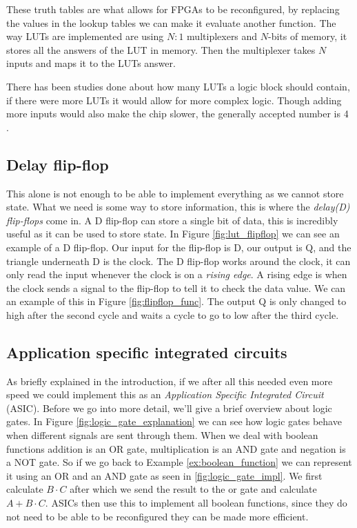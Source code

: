 These truth tables are what allows for FPGAs to be reconfigured, by replacing
the values in the lookup tables we can make it evaluate another function. The
way LUTs are implemented are using $N:1$ multiplexers and $N$-bits of memory,
it stores all the answers of the LUT in memory. Then the multiplexer takes $N$
inputs and maps it to the LUTs answer.

There has been studies done about how many LUTs a logic block should contain, if
there were more LUTs it would allow for more complex logic. Though adding more
inputs would also make the chip slower, the generally accepted number is 4
\citep{HideharuAmano8}.

\subsection{Delay flip-flop}
This alone is not enough to be able to implement everything as we cannot store
state. What we need is some way to store information, this is where the
\textit{delay(D) flip-flops} come in. A D flip-flop can store a single bit of
data, this is incredibly useful as it can be used to store state. In Figure
\ref{fig:lut_flipflop} we can see an example of a D flip-flop. Our input for
the flip-flop is D, our output is Q, and the triangle underneath D is the
clock. The D flip-flop works around the clock, it can only read the input
whenever the clock is on a \textit{rising edge}. A rising edge is when the
clock sends a signal to the flip-flop to tell it to check the data value. We
can an example of this in Figure \ref{fig:flipflop_func}. The output Q is only
changed to high after the second cycle and waits a cycle to go to low after the
third cycle.

\subsection{Application specific integrated circuits}
As briefly explained in the introduction, if we after all this needed even more
speed we could implement this as an \textit{Application Specific Integrated
Circuit} (ASIC). Before we go into more detail, we'll give a brief overview
about logic gates. In Figure \ref{fig:logic_gate_explanation} we can see how
logic gates behave when different signals are sent through them. When we deal
with boolean functions addition is an OR gate, multiplication is an AND gate
and negation is a NOT gate. So if we go back to Example
\ref{ex:boolean_function} we can represent it using an OR and an AND gate as
seen in \ref{fig:logic_gate_impl}. We first calculate $B \cdot C$ after which
we send the result to the or gate and calculate $A + B \cdot C$. ASICs then use
this to implement all boolean functions, since they do not need to be able
to be reconfigured they can be made more efficient.

